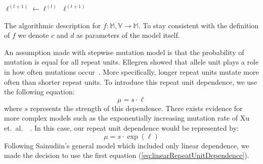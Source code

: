 
\begin{algorithm}[t]
    \SetAlgoLined
    \DontPrintSemicolon
     {
        $\ell^{(t+1)} \gets \ell^{(t)}$ \;
        \Return $\ell^{(t+1)}$ \;
    }
    \caption{The algorithmic description for $f: \mathbb{M},\mathbb{V} \rightarrow \mathbb{M}$.
    To stay consistent with the definition of $f$ we denote $c$ and $d$ as parameters of the model itself.}
    \label{alg:mutateFunction}
\end{algorithm}

An assumption made with stepwise mutation model is that the probability of mutation is equal for all repeat units.
Ellegren showed that allele unit plays a role in how often mutations
occur~\cite{ellegrenHeterogeneousMutationProcesses2000}.
More specifically, longer repeat units mutate more often than shorter repeat units.
To introduce this repeat unit dependence, we use the following equation:
\begin{equation}\label{eq:linearRepeatUnitDependence}
    \mu = s \cdot \ell
\end{equation}
where $s$ represents the strength of this dependence.
There exists evidence for more complex models such as the exponentially increasing mutation rate of Xu et.\ al.\
~\cite{xuDirectionMicrosatelliteMutations2000}.
In this case, our repeat unit dependence would be represented by:
\begin{equation}
    \mu = s \cdot \exp (\ell)
\end{equation}
Following Sainudiin's general model which included only linear dependence, we made the decision to use the first
equation (\autoref{eq:linearRepeatUnitDependence}).


